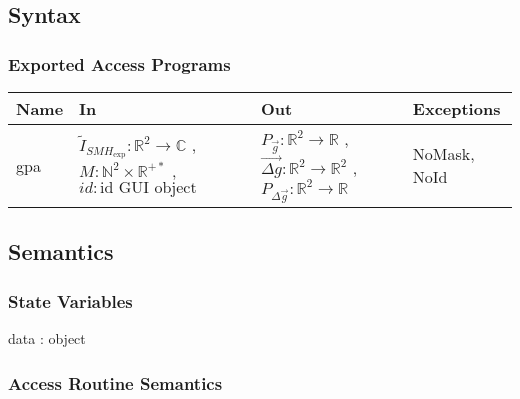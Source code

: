 \documentclass[12pt, titlepage]{article}
\begin{document}
\subsection{Syntax}

\subsubsection{Exported Access Programs}

\begin{center}
\begin{tabular}{p{2cm} p{4cm} p{4cm} p{2cm}}
\hline
\textbf{Name} & \textbf{In} & \textbf{Out} & \textbf{Exceptions} \\
\hline
gpa & $\widetilde{I}_{\mathit{SMH}_{\text{exp}}}:\mathbb{R}^2\rightarrow\mathbb{C}$ , $M:\mathbb{N}^2\times\mathbb{R}^{+*}$ , $id : \text{id GUI object}$ & $P_{\vec{g}}:\mathbb{R}^2\rightarrow\mathbb{R}$ , $\overrightarrow{\Delta g}:\mathbb{R}^2\rightarrow\mathbb{R}^2$ , $P_{\Delta \vec{g}}:\mathbb{R}^2\rightarrow\mathbb{R}$ & NoMask, NoId\\
\hline
\end{tabular}
\end{center}

\subsection{Semantics}

\subsubsection{State Variables}

data : object

\subsubsection{Access Routine Semantics}
\end{document}
